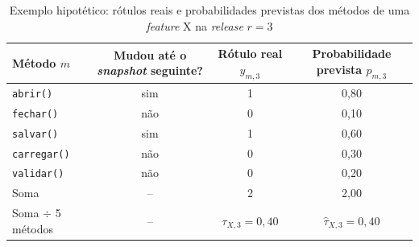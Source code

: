 \begin{table}[htbp]
    \captionsetup{}
    \centering
    \footnotesize
    \caption{Exemplo hipotético: rótulos reais e probabilidades previstas dos métodos de uma \textit{feature} X na
        \textit{release} $r = 3$}
    \label{tab:met-ex-feature}
    \begin{tabular}{lccc}
        \toprule
        Método $m$ & Mudou até o \textit{snapshot} seguinte? & Rótulo real $y_{m,3}$ & Probabilidade prevista
            $\hat{p}_{m,3}$ \\
        \midrule
        \texttt{abrir()}    & sim & 1 & 0,80 \\
        \texttt{fechar()}   & não & 0 & 0,10 \\
        \texttt{salvar()}   & sim & 1 & 0,60 \\
        \texttt{carregar()} & não & 0 & 0,30 \\
        \texttt{validar()}  & não & 0 & 0,20 \\
        \midrule
        Soma                & --  & 2 & 2,00 \\
        Soma $\div$ 5 métodos & -- & $\tau_{X,3} = 0{,}40$ & $\hat{\tau}_{X,3} = 0{,}40$ \\
        \bottomrule
    \end{tabular}
\end{table}%
